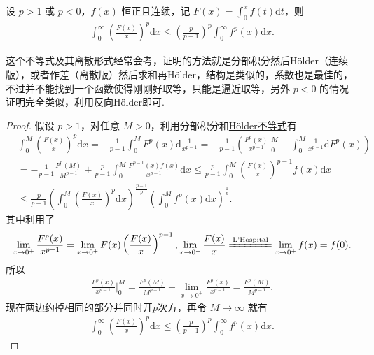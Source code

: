 \documentclass[../../main.tex]{subfiles}%
\begin{document}
\begin{theorem}[Hardy不等式]\label{theorem:Hardy(哈代)不等式}
设 $p > 1$ 或 $p < 0$，$f(x)$ 恒正且连续，记 $F(x) = \int_0^x f(t) \mathrm{d}t$，则
\begin{align*}
\int_0^\infty \left( \frac{F(x)}{x} \right)^p \mathrm{d}x \leqslant \left( \frac{p}{p - 1} \right)^p \int_0^\infty f^p(x) \mathrm{d}x.
\end{align*}
\end{theorem}
\begin{remark}
这个不等式及其离散形式经常会考，证明的方法就是分部积分然后Hölder（连续版），或者作差（离散版）然后求和再Hölder，结构是类似的，系数也是最佳的，不过并不能找到一个函数使得刚刚好取等，只能是逼近取等，另外 $p < 0$ 的情况证明完全类似，利用反向Hölder即可.
\end{remark}
\begin{proof}

假设 $p > 1$，对任意 $M > 0$，利用分部积分和\hyperref[theorem:Hölder(赫尔德)不等式(积分形式)]{Hölder不等式}有
\begin{align*}
&\int_0^M \left( \frac{F(x)}{x} \right)^p \mathrm{d}x = -\frac{1}{p - 1} \int_0^M F^p(x) \mathrm{d}\frac{1}{x^{p - 1}} = -\frac{1}{p - 1} \left( \frac{F^p(x)}{x^{p - 1}} \bigg|_0^M - \int_0^M \frac{1}{x^{p - 1}} \mathrm{d}F^p(x) \right)
\\
&= -\frac{1}{p - 1} \frac{F^p(M)}{M^{p - 1}} + \frac{p}{p - 1} \int_0^M \frac{F^{p - 1}(x) f(x)}{x^{p - 1}} \mathrm{d}x \leqslant \frac{p}{p - 1} \int_0^M \left( \frac{F(x)}{x} \right)^{p - 1} f(x) \mathrm{d}x
\\
&\leqslant \frac{p}{p - 1} \left( \int_0^M \left( \frac{F(x)}{x} \right)^p \mathrm{d}x \right)^{\frac{p - 1}{p}} \left( \int_0^M f^p(x) \mathrm{d}x \right)^{\frac{1}{p}}.
\end{align*}
其中利用了
\begin{align*}
\lim_{x \to 0^+} \frac{F^p(x)}{x^{p - 1}} = \lim_{x \to 0^+} F(x) \left( \frac{F(x)}{x} \right)^{p - 1}, \lim_{x \to 0^+} \frac{F(x)}{x} \xlongequal{\text{L'Hospital}} \lim_{x \to 0^+} f(x) = f(0).
\end{align*}
所以
\begin{align*}
\frac{F^p(x)}{x^{p - 1}} \bigg|_0^M = \frac{F^p(M)}{M^{p - 1}} - \lim_{x \to 0^+} \frac{F^p(x)}{x^{p - 1}} = \frac{F^p(M)}{M^{p - 1}}.
\end{align*}
现在两边约掉相同的部分并同时开$p$次方，再令 $M \to \infty$ 就有
\begin{align*}
\int_0^\infty \left( \frac{F(x)}{x} \right)^p \mathrm{d}x \leqslant \left( \frac{p}{p - 1} \right)^p \int_0^\infty f^p(x) \mathrm{d}x.
\end{align*}

\end{proof}
\end{document}

